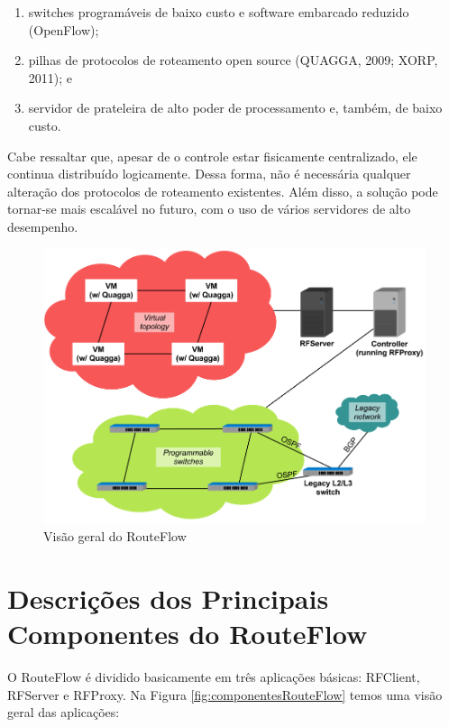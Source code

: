 \begin{enumerate}[{a)}]
\item switches programáveis de baixo custo e software embarcado reduzido (OpenFlow); 
\item pilhas de protocolos de roteamento open source (QUAGGA, 2009; XORP, 2011); e 
\item servidor de prateleira de alto poder de processamento e, também, de baixo custo.
\end{enumerate}

Cabe ressaltar que, apesar de o controle estar fisicamente centralizado, ele continua distribuído
logicamente. Dessa forma, não é necessária qualquer alteração dos protocolos de roteamento
existentes. Além disso, a solução pode tornar-se mais escalável no futuro, com o uso de vários
servidores de alto desempenho.

\begin{figure}[hb]
\centering
\includegraphics[width=135mm]{visaoGeralRouteFlow.png}
\caption{Visão geral do RouteFlow}
\label{fig:visaoGeralRouteFlow}
\end{figure}

\section{Descrições dos Principais Componentes do RouteFlow}

O RouteFlow é dividido basicamente em três aplicações básicas: RFClient, RFServer e RFProxy. Na Figura \ref{fig:componentesRouteFlow} temos uma visão geral das aplicações:

